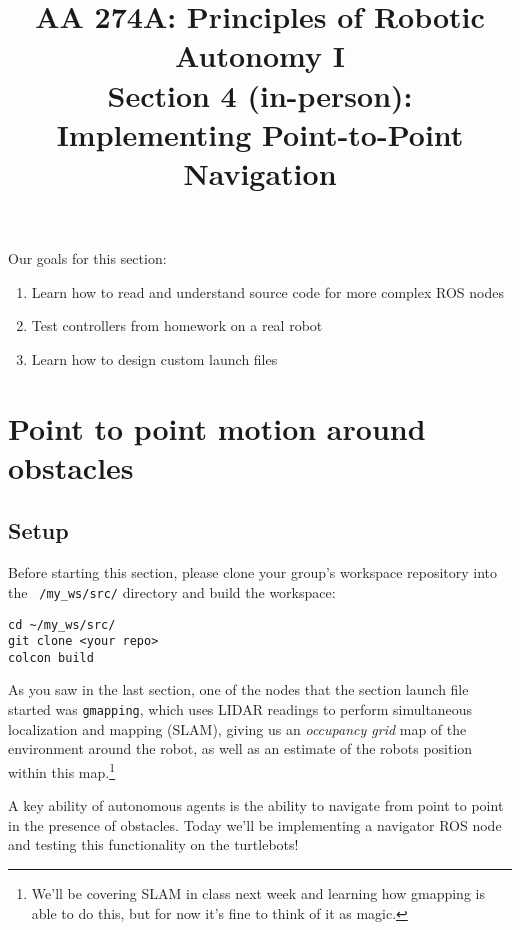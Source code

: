 \documentclass{article}
\title{AA 274A: Principles of Robotic Autonomy I \\Section 4 (in-person): Implementing Point-to-Point Navigation}
\date{}
\begin{document}
\maketitle
\pagestyle{fancy}
\vspace{-1.25cm}
Our goals for this section: 
\begin{enumerate}
    \item Learn how to read and understand source code for more complex ROS nodes
    \item Test controllers from homework on a real robot
    \item Learn how to design custom launch files
\end{enumerate}

\section{Point to point motion around obstacles}
\subsection*{Setup}
\color{blue}
Before starting this section, please clone your group's workspace repository into the \texttt{~/my\_ws/src/} directory and build the workspace:
\begin{lstlisting}
cd ~/my_ws/src/
git clone <your repo>
colcon build
\end{lstlisting}

\color{black}

As you saw in the last section, one of the nodes that the section launch file started was \texttt{gmapping}, which uses LIDAR readings to perform simultaneous localization and mapping (SLAM), giving us an \textit{occupancy grid} map of the environment around the robot, as well as an estimate of the robots position within this map.\footnote{We'll be covering SLAM in class next week and learning how gmapping is able to do this, but for now it's fine to think of it as magic.}

A key ability of autonomous agents is the ability to navigate from point to point in the presence of obstacles. Today we'll be implementing a navigator ROS node and testing this functionality on the turtlebots!
\end{document}

